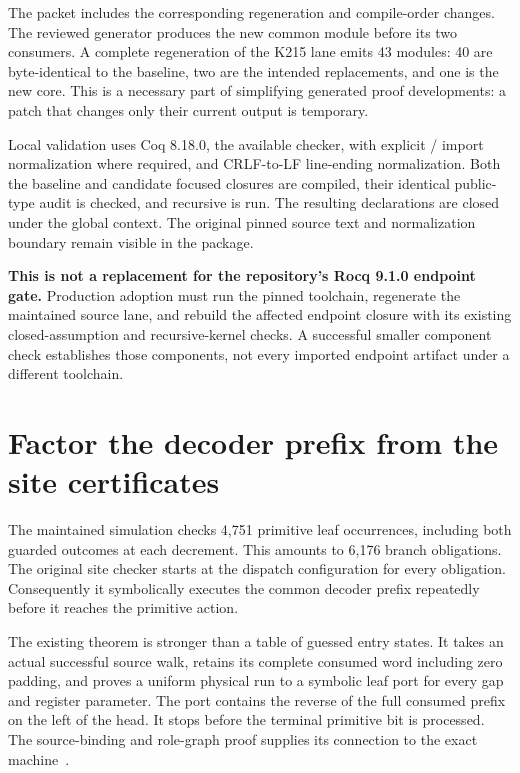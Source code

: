 \documentclass[11pt,letterpaper]{article}
\newcommand{\code}[1]{\texttt{\small\detokenize{#1}}}
\begin{document}
The packet includes the corresponding regeneration and compile-order changes.
The reviewed generator produces the new common module before its two consumers.
A complete regeneration of the K215 lane emits 43 modules: 40 are byte-identical
to the baseline, two are the intended replacements, and one is the new core.
This is a necessary part of simplifying generated proof developments: a patch
that changes only their current output is temporary.

Local validation uses Coq 8.18.0, the available checker, with explicit
\code{Stdlib}/\code{Coq} import normalization where required, and CRLF-to-LF
line-ending normalization. Both the baseline
and candidate focused closures are compiled, their identical public-type
audit is checked, and recursive \code{coqchk} is run. The resulting declarations
are closed under the global context. The original pinned source text and
normalization boundary remain visible in the package.

\textbf{This is not a replacement for the repository's Rocq 9.1.0 endpoint
gate.} Production adoption must run the pinned toolchain, regenerate the
maintained source lane, and rebuild the affected endpoint closure with its
existing closed-assumption and recursive-kernel checks. A successful smaller
component check establishes those components, not every imported endpoint
artifact under a different toolchain.

\section{Factor the decoder prefix from the site certificates}
\label{sec:residual}

The maintained simulation checks 4,751 primitive leaf occurrences, including
both guarded outcomes at each decrement. This amounts to 6,176 branch
obligations. The original site checker starts at the dispatch configuration
for every obligation. Consequently it symbolically executes the common decoder
prefix repeatedly before it reaches the primitive action.

The existing \code{KDecoderPrefix215.walk_prefix} theorem is stronger than a
table of guessed entry states. It takes an actual successful source walk,
retains its complete consumed word including zero padding, and proves a
uniform physical run to a symbolic leaf port for every gap and register
parameter. The port contains the reverse of the full consumed prefix on the
left of the head. It stops before the terminal primitive bit is processed.
The source-binding and role-graph proof supplies its connection to the exact
machine~\cite{prefix}.
\end{document}
